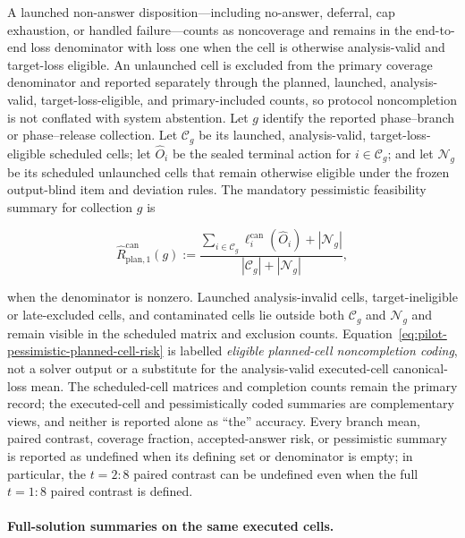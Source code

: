 \documentclass[10pt]{article} %
\providecommand{\1}{\mathbf{1}}  %
\theoremstyle{remark}
\theoremstyle{definition}
\begin{document}
A launched non-answer disposition---including no-answer, deferral, cap exhaustion, or handled failure---counts as noncoverage and remains in the end-to-end loss denominator with loss one when the cell is otherwise analysis-valid and target-loss eligible. An unlaunched cell is excluded from the primary coverage denominator and reported separately through the planned, launched, analysis-valid, target-loss-eligible, and primary-included counts, so protocol noncompletion is not conflated with system abstention. Let $g$ identify the reported phase--branch or phase--release collection. Let $\mathcal C_g$ be its launched, analysis-valid, target-loss-eligible scheduled cells; let $\widehat O_i$ be the sealed terminal action for $i\in\mathcal C_g$; and let $\mathcal N_g$ be its scheduled unlaunched cells that remain otherwise eligible under the frozen output-blind item and deviation rules. The mandatory pessimistic feasibility summary for collection $g$ is

\begin{equation}
\widehat R_{\mathrm{plan},1}^{\mathrm{can}}(g)
:=
\frac{
\sum_{i\in\mathcal C_g}\ell_i^{\mathrm{can}}(\widehat O_i)+|\mathcal N_g|
}{
|\mathcal C_g|+|\mathcal N_g|
},
\label{eq:pilot-pessimistic-planned-cell-risk}
\end{equation}

when the denominator is nonzero. Launched analysis-invalid cells, target-ineligible or late-excluded cells, and contaminated cells lie outside both $\mathcal C_g$ and $\mathcal N_g$ and remain visible in the scheduled matrix and exclusion counts. Equation~\ref{eq:pilot-pessimistic-planned-cell-risk} is labelled \emph{eligible planned-cell noncompletion coding}, not a solver output or a substitute for the analysis-valid executed-cell canonical-loss mean. The scheduled-cell matrices and completion counts remain the primary record; the executed-cell and pessimistically coded summaries are complementary views, and neither is reported alone as ``the'' accuracy. Every branch mean, paired contrast, coverage fraction, accepted-answer risk, or pessimistic summary is reported as undefined when its defining set or denominator is empty; in particular, the $t=2{:}8$ paired contrast can be undefined even when the full $t=1{:}8$ paired contrast is defined.

\paragraph{Full-solution summaries on the same executed cells.}
\end{document}
